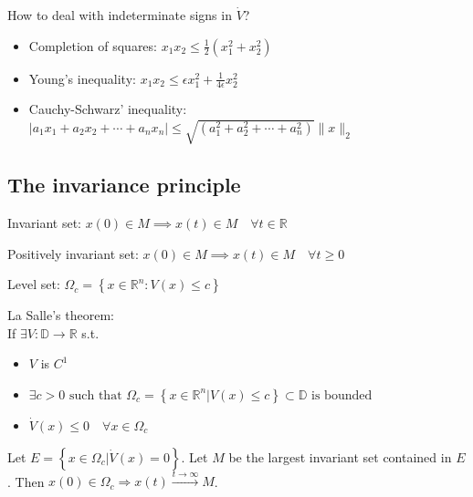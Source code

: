 \begin{remark}
    How to deal with indeterminate signs in $\dot{V}$?
    \begin{itemize}[topsep=0pt]
        \item Completion of squares: $x_1 x_2 \leq \frac{1}{2}(x_1^2 + x_2^2)$
        \item Young's inequality: $x_1 x_2 \leq \epsilon x_1^2 + \frac{1}{4\epsilon}x_2^2$
        \item Cauchy-Schwarz' inequality: $\left|a_{1} x_{1}+a_{2} x_{2}+\cdots+a_{n} x_{n}\right| \leq \sqrt{\left(a_{1}^{2}+a_{2}^{2}+\cdots+a_{n}^{2}\right)}\|x\|_{2}$
    \end{itemize}
\end{remark}

\subsection{The invariance principle}
\begin{definition}
    Invariant set: $x(0) \in M \implies x(t) \in M \quad \forall t \in \mathbb{R}$
\end{definition}

\begin{definition}
    Positively invariant set: $x(0) \in M \implies x(t) \in M \quad \forall t \geq 0$
\end{definition}

\begin{definition}
    Level set: $\Omega_{c}=\left\{x \in \mathbb{R}^{n}: V(x) \leq c\right\}$
\end{definition}

\begin{tcolorbox}[colback=white, colframe=teal]
\begin{theorem}
    La Salle's theorem:\\
    If $\exists V : \mathbb{D} \rightarrow \mathbb{R}$ s.t.
    \begin{itemize}[topsep=0pt]
        \item $V$ is $C^1$
        \item $\exists c>0 \text { such that } \Omega_{c}=\left\{x \in \mathbb{R}^{n} | V(x) \leq c\right\} \subset \mathbb{D} \text { is bounded }$
        \item $\dot{V}(x) \leq 0 \quad \forall x \in \Omega_{c}$
    \end{itemize}
    Let $E=\left\{x \in \Omega_{c} | \dot{V}(x)=0\right\}$. Let $M$ be the largest invariant set contained in $E$.
    Then $x(0) \in \Omega_{c} \Rightarrow x(t) \stackrel{t \rightarrow \infty}{\longrightarrow} M$.
\end{theorem}
\end{tcolorbox}

